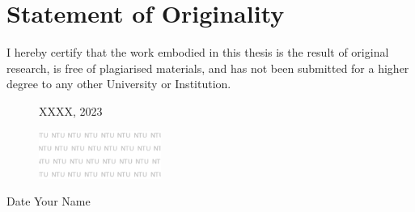 \chapter*{Statement of Originality}
\begin{spacing}{2}
\noindent I hereby certify that the work embodied in this thesis is the result of original research, is free of plagiarised materials, and has not been submitted for a higher degree to any other University or Institution.
\end{spacing}
\vspace*{6cm}
\begin{figure}[htbp]
  \begin{minipage}[c]{0.5\textwidth}
    XXXX, 2023
  \end{minipage}\hfill
  \begin{minipage}[c]{0.45\textwidth}
    \includegraphics[width=4cm]{pre_figure/ntu_water.png}
  \end{minipage}
\end{figure}
\vspace*{-0.1cm}
Date \hspace{7cm} Your Name
\clearpage
\thispagestyle{empty}
\mbox{} 
\newpage
\setcounter{page}{2}

